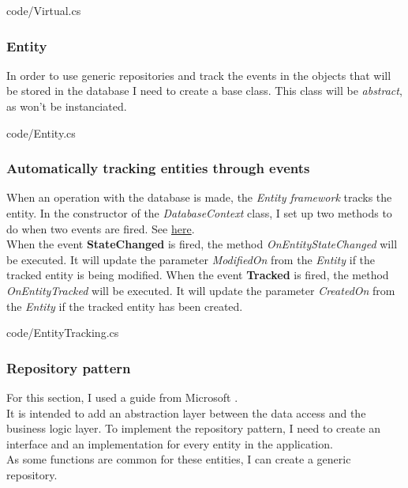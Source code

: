         
        {code/Virtual.cs}

        \subsubsection{Entity}
            In order to use generic repositories and track the events in the objects that will be stored in the database I need to create a base class. This class will be \textit{abstract}, as won't be instanciated. 
            
            
            {code/Entity.cs}
        \subsubsection{Automatically tracking entities through events}
        When an operation with the database is made, the \textit{Entity framework} tracks the entity.  
        In the constructor of the \textit{DatabaseContext} class, I set up two methods to do when two events are fired. See \href{https://docs.microsoft.com/en-us/dotnet/api/microsoft.entityframeworkcore.changetracking.changetracker?view=efcore-5.0}{here}. \\

        When the event \textbf{StateChanged} is fired, the method \textit{OnEntityStateChanged} will be executed. It will update the parameter \textit{ModifiedOn} from the \textit{Entity} if the tracked entity is being modified.
        When the event \textbf{Tracked} is fired, the method \textit{OnEntityTracked} will be executed. It will update the parameter \textit{CreatedOn} from the \textit{Entity} if the tracked entity has been created.

            
            {code/EntityTracking.cs}
        
        \subsubsection{Repository pattern}
            For this section, I used a guide from Microsoft \cite{RepoAndUW}. \\
            It is intended to add an abstraction layer between the data access and the business logic layer. To implement the repository pattern, I need to create an interface and an implementation for every entity in the application. \\
            As some functions are common for these entities, I can create a generic repository. \\


